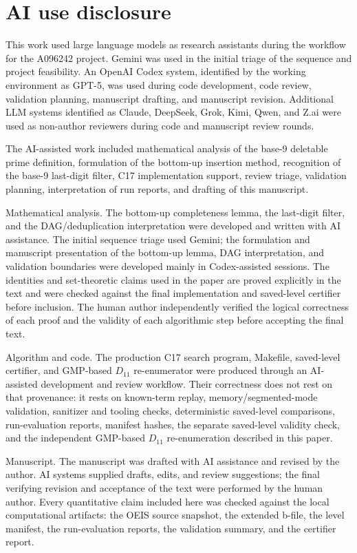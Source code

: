 \documentclass[11pt]{article}
\theoremstyle{definition}
\theoremstyle{remark}
\begin{document}
\section*{AI use disclosure}

This work used large language models as research assistants during the
workflow for the A096242 project.  Gemini was used in the initial triage of
the sequence and project feasibility.  An OpenAI Codex system, identified by
the working environment as GPT-5, was used during code development, code
review, validation planning, manuscript drafting, and manuscript revision.
Additional LLM systems identified as Claude, DeepSeek, Grok, Kimi, Qwen, and
Z.ai were used as non-author reviewers during code and manuscript review
rounds.

The AI-assisted work included mathematical analysis of the base-9 deletable
prime definition, formulation of the bottom-up insertion method, recognition
of the base-9 last-digit filter, C17 implementation support, review triage,
validation planning, interpretation of run reports, and drafting of this
manuscript.

Mathematical analysis.  The bottom-up completeness lemma, the last-digit
filter, and the DAG/deduplication interpretation were developed and written
with AI assistance.  The initial sequence triage used Gemini; the formulation
and manuscript presentation of the bottom-up lemma, DAG interpretation, and
validation boundaries were developed mainly in Codex-assisted sessions.  The
identities and set-theoretic claims used in the paper are proved explicitly
in the text and were checked against the final implementation and saved-level
certifier before inclusion.
The human author independently verified the logical correctness of each proof
and the validity of each algorithmic step before accepting the final text.

Algorithm and code.  The production C17 search program, Makefile,
saved-level certifier, and GMP-based \(D_{11}\) re-enumerator were produced
through an AI-assisted development and review workflow.  Their correctness
does not rest on that provenance: it rests on known-term replay,
memory/segmented-mode validation, sanitizer and tooling checks,
deterministic saved-level comparisons, run-evaluation reports, manifest
hashes, the separate saved-level validity check, and the independent
GMP-based \(D_{11}\) re-enumeration described in this paper.

Manuscript.  The manuscript was drafted with AI assistance and revised by the
author.  AI systems supplied drafts, edits, and review suggestions; the final
verifying revision and acceptance of the text were performed by the human
author.  Every quantitative claim included here was checked against the local
computational artifacts: the OEIS source snapshot, the extended b-file, the
level manifest, the run-evaluation reports, the validation summary, and the
certifier report.
\end{document}
